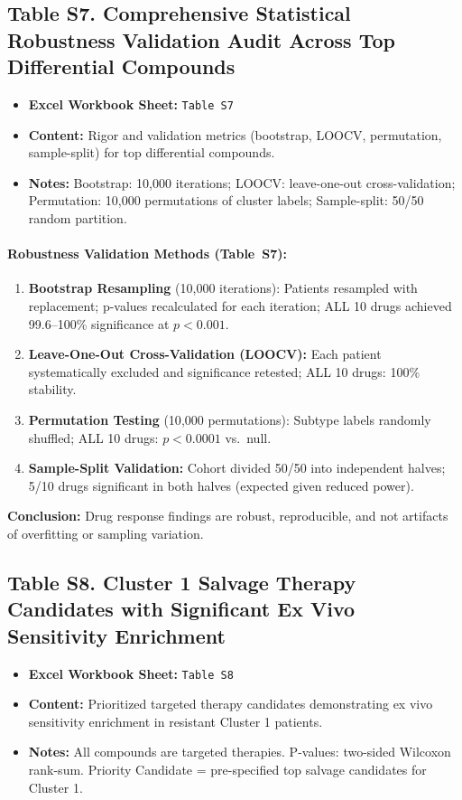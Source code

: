 \documentclass[11pt,a4paper]{article}
\begin{document}
\subsection*{Table S7. Comprehensive Statistical Robustness Validation Audit Across Top Differential Compounds}
\hypertarget{tab:tabS7}{}
\label{tab:tabS7}
\begin{itemize}
    \item \textbf{Excel Workbook Sheet:} \texttt{Table S7}
    \item \textbf{Content:} Rigor and validation metrics (bootstrap, LOOCV, permutation, sample-split) for top differential compounds.
    \item \textbf{Notes:} Bootstrap: 10,000 iterations; LOOCV: leave-one-out cross-validation; Permutation: 10,000 permutations of cluster labels; Sample-split: 50/50 random partition.
\end{itemize}

\paragraph{Robustness Validation Methods (Table~S7):}
\begin{enumerate}
    \item \textbf{Bootstrap Resampling} (10{,}000 iterations): Patients resampled with replacement; p-values recalculated for each iteration; ALL 10 drugs achieved 99.6--100\% significance at $p<0.001$.
    \item \textbf{Leave-One-Out Cross-Validation (LOOCV):} Each patient systematically excluded and significance retested; ALL 10 drugs: 100\% stability.
    \item \textbf{Permutation Testing} (10{,}000 permutations): Subtype labels randomly shuffled; ALL 10 drugs: $p<0.0001$ vs.\ null.
    \item \textbf{Sample-Split Validation:} Cohort divided 50/50 into independent halves; 5/10 drugs significant in both halves (expected given reduced power).
\end{enumerate}
\textbf{Conclusion:} Drug response findings are robust, reproducible, and not artifacts of overfitting or sampling variation.

\subsection*{Table S8. Cluster 1 Salvage Therapy Candidates with Significant Ex Vivo Sensitivity Enrichment}
\hypertarget{tab:tabS8}{}
\label{tab:tabS8}
\begin{itemize}
    \item \textbf{Excel Workbook Sheet:} \texttt{Table S8}
    \item \textbf{Content:} Prioritized targeted therapy candidates demonstrating ex vivo sensitivity enrichment in resistant Cluster 1 patients.
    \item \textbf{Notes:} All compounds are targeted therapies. P-values: two-sided Wilcoxon rank-sum. Priority Candidate = pre-specified top salvage candidates for Cluster 1.
\end{itemize}
\end{document}

